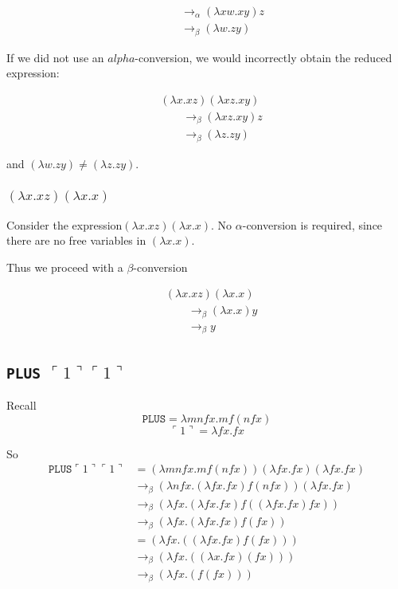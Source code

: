 \documentclass[paper=a4, fontsize=11pt]{scrartcl} %
\numberwithin{equation}{section} %
\numberwithin{figure}{section} %
\numberwithin{table}{section} %
\begin{document}
\begin{align*}
& \qquad{} \rightarrow_\alpha (\lambda xw.xy) z \\
& \qquad{} \rightarrow_\beta (\lambda w.zy)
\end{align*}

If we did not use an $alpha$-conversion, we would incorrectly obtain the reduced expression:

\begin{align*}
& (\lambda x.xz)(\lambda xz.xy) \\
& \qquad{} \rightarrow_\beta  (\lambda xz.xy) z \\
& \qquad{} \rightarrow_\beta (\lambda z.zy)
\end{align*}

and $(\lambda w.zy) \ne  (\lambda z.zy)$.


\subsubsection{$(\lambda x.xz)(\lambda x.x)$}

Consider the expression$(\lambda x.xz)(\lambda x.x)$. No $\alpha$-conversion is required, since there are no free variables in $(\lambda x.x)$.

Thus we proceed with a $\beta$-conversion

\begin{align*}
&(\lambda x.xz)(\lambda x.x) \\
& \qquad{} \rightarrow_\beta  (\lambda x.x) y \\
& \qquad{} \rightarrow_\beta  y
\end{align*}

\subsection{\texttt{PLUS} $\ulcorner 1 \urcorner \ulcorner 1 \urcorner$}

Recall
\[\texttt{PLUS} = \lambda mnfx . mf (nfx)\]
\[\ulcorner 1 \urcorner  = \lambda fx.fx\]
 
 So
\begin{align*}
\texttt{PLUS} \ulcorner 1 \urcorner \ulcorner 1 \urcorner &= \left(\lambda mnfx . mf (nfx)\right)\left( \lambda fx.fx\right)\left( \lambda fx.fx\right)\\
	&\rightarrow_\beta \left(\lambda nfx . \left( \lambda fx.fx\right)f (nfx)\right)\left( \lambda fx.fx\right)\\
	&\rightarrow_\beta \left(\lambda fx . \left( \lambda fx.fx\right)f (\left( \lambda fx.fx\right)fx)\right)\\
	&\rightarrow_\beta \left(\lambda fx . \left( \lambda fx.fx\right)f (fx)\right)\\
	&=  \left(\lambda fx . \left(\left( \lambda fx.fx\right)f (fx)\right)\right)\\
	&\rightarrow_\beta \left(\lambda fx . \left(\left( \lambda x.fx\right)(fx)\right)\right)\\
	&\rightarrow_\beta \left(\lambda fx . \left(f(fx)\right)\right)\\
\end{align*}
\end{document}
